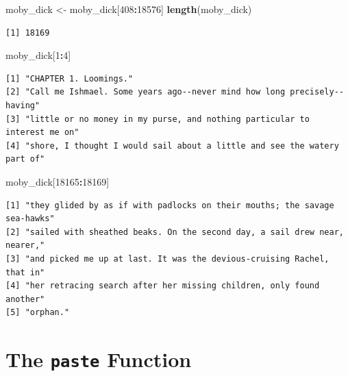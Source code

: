 \documentclass[
]{krantz}
\makeatletter
\newenvironment{Shaded}{\begin{snugshade}}{\end{snugshade}}
\newcommand{\DecValTok}[1]{\textcolor[rgb]{0.06,0.06,0.06}{#1}}
\newcommand{\KeywordTok}[1]{\textcolor[rgb]{0.27,0.27,0.27}{\textbf{#1}}}
\newcommand{\NormalTok}[1]{#1}
\newcommand{\OperatorTok}[1]{\textcolor[rgb]{0.43,0.43,0.43}{\textbf{#1}}}
\newcommand{\StringTok}[1]{\textcolor[rgb]{0.5,0.5,0.5}{#1}}
\newenvironment{kframe}{%
\medskip{}
\setlength{\fboxsep}{.8em}
 \def\at@end@of@kframe{}%
 \ifinner\ifhmode%
  \def\at@end@of@kframe{\end{minipage}}%
  \begin{minipage}{\columnwidth}%
 \fi\fi%
 \def\FrameCommand##1{\hskip\@totalleftmargin \hskip-\fboxsep
 \colorbox{shadecolor}{##1}\hskip-\fboxsep
     \hskip-\linewidth \hskip-\@totalleftmargin \hskip\columnwidth}%
 \MakeFramed {\advance\hsize-\width
   \@totalleftmargin\z@ \linewidth\hsize
   \@setminipage}}%
 {\par\unskip\endMakeFramed%
 \at@end@of@kframe}
\renewenvironment{Shaded}{\begin{kframe}}{\end{kframe}}
\makeatother
\begin{document}
\begin{Shaded}
\begin{Highlighting}[]
\NormalTok{moby\_dick \textless{}{-}}\StringTok{ }\NormalTok{moby\_dick[}\DecValTok{408}\OperatorTok{:}\DecValTok{18576}\NormalTok{]}
\KeywordTok{length}\NormalTok{(moby\_dick)}
\end{Highlighting}
\end{Shaded}

\begin{verbatim}
[1] 18169
\end{verbatim}

\begin{Shaded}
\begin{Highlighting}[]
\NormalTok{moby\_dick[}\DecValTok{1}\OperatorTok{:}\DecValTok{4}\NormalTok{]}
\end{Highlighting}
\end{Shaded}

\begin{verbatim}
[1] "CHAPTER 1. Loomings."                                                    
[2] "Call me Ishmael. Some years ago--never mind how long precisely--having"  
[3] "little or no money in my purse, and nothing particular to interest me on"
[4] "shore, I thought I would sail about a little and see the watery part of" 
\end{verbatim}

\begin{Shaded}
\begin{Highlighting}[]
\NormalTok{moby\_dick[}\DecValTok{18165}\OperatorTok{:}\DecValTok{18169}\NormalTok{]}
\end{Highlighting}
\end{Shaded}

\begin{verbatim}
[1] "they glided by as if with padlocks on their mouths; the savage sea-hawks"
[2] "sailed with sheathed beaks. On the second day, a sail drew near, nearer,"
[3] "and picked me up at last. It was the devious-cruising Rachel, that in"   
[4] "her retracing search after her missing children, only found another"     
[5] "orphan."                                                                 
\end{verbatim}

\hypertarget{the-paste-function}{%
\section{\texorpdfstring{The \texttt{paste} Function}{The paste Function}}\label{the-paste-function}}
\end{document}

